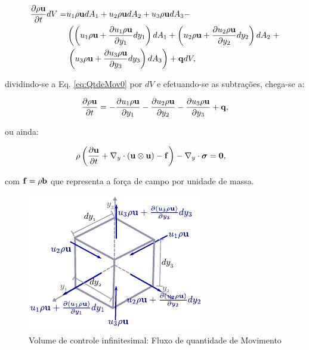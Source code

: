 \documentclass[tese_patricia]{subfiles}%
\begin{document}
\begin{align}
	\begin{split}
	\frac{\partial \rho \mathbf{u}}{\partial t}dV =& u_1\rho \mathbf{u} dA_1 + u_2\rho \mathbf{u} dA_2 + u_3 \rho \mathbf{u} dA_3 - \\
	 & \left(\left(u_1 \rho \mathbf{u} + \frac{\partial u_1 \rho \mathbf{u}}{\partial y_1}dy_1 \right)dA_1 + \left(u_2 \rho \mathbf{u} + \frac{\partial u_2 \rho \mathbf{u}}{\partial y_2}dy_2 \right)dA_2 \right. + \\ & \left.   \left(u_3 \rho \mathbf{u} + \frac{\partial u_3 \rho \mathbf{u}}{\partial y_3}dy_3 \right)dA_3\right) + \mathbf{q} dV,
	\label{eq:QtdeMov0} 
	\end{split}
\end{align}	

\noindent dividindo-se a Eq. \ref{eq:QtdeMov0} por $dV$ e efetuando-se as subtrações, chega-se a:

\begin{align}
		\frac{\partial \rho \mathbf{u}}{\partial t} = 
		-\frac{\partial u_1 \rho \mathbf{u}}{\partial y_1} 
		-\frac{\partial u_2 \rho \mathbf{u}}{\partial y_2}  
		-\frac{\partial u_3 \rho \mathbf{u}}{\partial y_3} + \mathbf{q},
		\label{eq:QtdeMov1} 
\end{align}

ou ainda:

\begin{align}
	\rho\left(\frac{\partial\mathbf{u}}{\partial t} + \nabla_y \cdot \left(\mathbf{u}\otimes\mathbf{u}\right) - \mathbf{f} \right) - \nabla_y \cdot \boldsymbol{\sigma}  &= \mathbf{0}, \label{eq:QtdeMov2} 
\end{align}

\noindent com $\mathbf{f} = \rho \mathbf{b}$ que representa a força de campo por unidade de massa.

\begin{figure}[htb!]
	\centering 
	\includegraphics[scale=1.5,trim=0cm 0.0cm 0cm 0.0cm, clip=true]{Imagens/Cap2/conserQtdeMov.pdf}	
	\caption{Volume de controle infinitesimal: Fluxo de quantidade de Movimento}
	\label{fig:VolInfiQtdeMov}
\end{figure}
\end{document}
